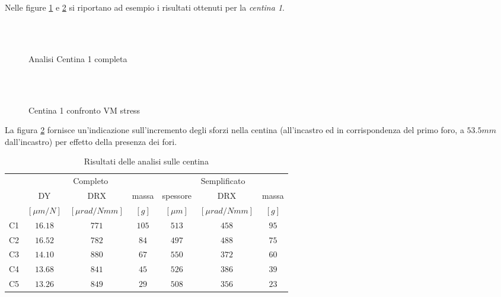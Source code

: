 \documentclass[
10pt, %
a4paper, %
oneside, %
headinclude,footinclude, %
BCOR5mm, %
]{scrartcl}
\begin{document}
Nelle figure \ref{fig:C1_comp} e \ref{fig:C1plot}  si riportano ad esempio i risultati ottenuti per la \emph{centina 1}.

\begin{figure}[tb]
	\centering
	 \\
	 \\
	\caption[Centina 1 completa]{Analisi Centina 1 completa} %
	\label{fig:C1_comp}
\end{figure}

\begin{figure}[tb]
	\centering
	 \\
	 \\
	\caption[Centina 1 confronto VM stress]{Centina 1 confronto VM stress} %
	\label{fig:C1plot}
\end{figure}

La figura \ref{fig:C1plot} fornisce un'indicazione sull'incremento degli sforzi nella centina (all'incastro ed in corrispondenza del primo foro, a $53.5mm$ dall'incastro) per effetto della presenza dei fori.


\begin{table}[bt]
	\caption{Risultati delle analisi sulle centina}
	\centering
	\begin{tabular}{rcccccc}
		\toprule
		& \multicolumn{3}{c}{Completo} & \multicolumn{3}{c}{Semplificato}\\
		\cmidrule(r){2-4} \cmidrule(l){5-7} 
		& DY  & DRX & massa & spessore & DRX  & massa \\
		& $[\mu m/N]$ & $[\mu rad/Nmm]$ & $[g]$ & $[\mu m]$ & $[\mu rad/Nmm]$ & $[g]$ \\
		\midrule
		C1 & $16.18$ & $771$ & $105$ & $513$ & $458$ & $95$ \\
		C2 & $16.52$ & $782$ & $84$ & $497$ & $488$ & $75$ \\
		C3 & $14.10$ & $880$ & $67$ & $550$ & $372$ & $60$ \\
		C4 & $13.68$ & $841$ & $45$ & $526$ & $386$ & $39$ \\
		C5 & $13.26$ & $849$ & $29$ & $508$ & $356$ & $23$ \\
		\bottomrule
	\end{tabular}
	\label{tab:centine}
\end{table}
\end{document}
